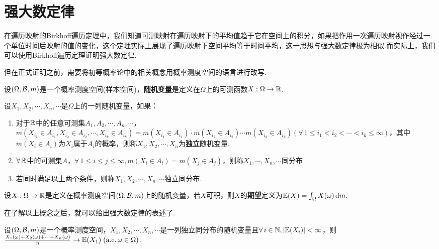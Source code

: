 \section{强大数定律}
在遍历映射的Birkhoff遍历定理中，我们知道可测映射在遍历映射下的平均值趋于它在空间上的积分，如果把作用一次遍历映射视作经过一个单位时间后映射的值的变化，这个定理实际上展现了遍历映射下空间平均等于时间平均，这一思想与强大数定律极为相似.而实际上，我们可以使用Birkhoff遍历定理证明强大数定律.\par
但在正式证明之前，需要将初等概率论中的相关概念用概率测度空间的语言进行改写.\par
\begin{definition}[随机变量]
    设$(\Omega,\mathcal{B},m)$是一个概率测度空间(样本空间)，\textbf{随机变量}是定义在$\Omega$上的可测函数$X:\Omega\to\mathbb{R}$.
\end{definition}
\begin{definition}[独立与同分布]
    设$X_1,X_2,\cdots,X_n,\cdots$是$\Omega$上的一列随机变量，如果：
    \begin{enumerate}[(1)]
        \item  对于$\mathbb{R}$中的任意可测集$A_1,A_2,\cdots,A_n,\cdots$，$m(X_{i_1}\in A_{i_1},X_{i_2}\in A_{i_2},\cdots,X_{i_k}\in A_{i_k})=m(X_{i_1}\in A_{i_1})\cdot m(X_{i_2}\in A_{i_2})\cdots m(X_{i_k}\in A_{i_k})(\forall\, 1\leq i_1<i_2<\cdots<i_k\leq\infty)$，其中$m(X_i\in A_i)$为$X_i$属于$A_i$的概率，则称$X_1,X_2,\cdots,X_n$为\textbf{独立}随机变量.
        \item $\forall\,\mathbb{R}$中的可测集$A$，$\forall\,1\leq i\leq j\leq \infty,m(X_i\in A_i)=m(X_j\in A_j)$，则称$X_1,\cdots, X_n,\cdots$同分布
        \item 若同时满足以上两个条件，则称$X_1,X_2,\cdots,X_n,\cdots$独立同分布.
    \end{enumerate}
\end{definition}
\begin{definition}[期望]
    设$X:\Omega\to\mathbb{R}$是定义在概率测度空间$(\Omega,\mathcal{B},m)$上的随机变量，若$X$可积，则$X$的\textbf{期望}定义为$\mathbb{E}(X)=\int_{\Omega}{X(\omega)}\mathop{}\!\mathrm{d} m$.
\end{definition}
在了解以上概念之后，就可以给出强大数定律的表述了.
\begin{theorem}[强大数定律]
    设$(\Omega,\mathcal{B},m)$是一个概率测度空间，$X_1,X_2,\cdots,X_n,\cdots$是一列独立同分布的随机变量且$\forall\, i\in\mathbb{N},|\mathbb{E}(X_i)|<\infty$，则$\frac{X_1(\omega)+X_2(\omega)+\cdots+X_n(\omega)}{n}\to\mathbb{E}(X_1)\;(\operatorname{\text{a.e.}} \omega\in\Omega)$.
\end{theorem}
